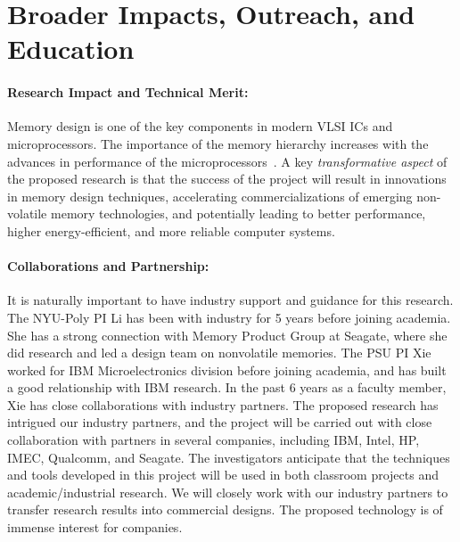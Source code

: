 
\section{Broader Impacts, Outreach, and Education}

\paragraph{\textbf{Research Impact and Technical Merit:}}
Memory design is one of the key components in modern VLSI ICs and microprocessors. The importance of the memory hierarchy
increases with the advances in performance of the
microprocessors~\cite{ITRS07}.  A key \textit{transformative aspect} of the proposed research is
that the success of the project will result in innovations in memory design techniques, accelerating commercializations of emerging non-volatile memory technologies, and potentially leading to better performance, higher energy-efficient, and more reliable computer systems.


\paragraph{\textbf{Collaborations and Partnership:}} It is naturally important to have industry support and guidance for this research.  The NYU-Poly PI Li has been with industry for 5 years before joining academia.  She has a strong connection with Memory
Product Group at Seagate, where she did research and led a design team on nonvolatile memories.    The PSU PI Xie worked for IBM Microelectronics division
before joining academia, and has built a good relationship with IBM
research. In the past 6 years as a faculty member, Xie has close collaborations with industry
partners. The proposed research has intrigued our industry partners, and the project will be
carried out with close collaboration with partners in several
companies, including IBM, Intel, HP, IMEC, Qualcomm, and Seagate.
The investigators
anticipate that the techniques and tools developed in this project will be
used in both classroom projects and academic/industrial
research. We will closely work with our industry partners to
transfer research results into commercial designs. The proposed
technology is of immense interest for companies.


